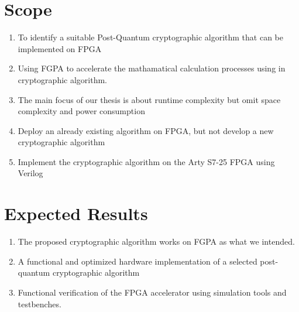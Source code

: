 \section{Scope}
\begin{enumerate}
	\item To identify a suitable Post-Quantum cryptographic algorithm that can be implemented on FPGA 
	\item Using FGPA to accelerate the mathamatical calculation processes using in cryptographic algorithm.
    \item The main focus of our thesis is about runtime complexity but omit space complexity and power consumption  
    \item Deploy an already existing algorithm on FPGA, but not develop a new cryptographic algorithm
    \item Implement the cryptographic algorithm on the Arty S7-25 FPGA using Verilog
\end{enumerate}

\section{Expected Results}
\begin{enumerate}
	\item The proposed cryptographic algorithm works on FGPA as what we intended.
	\item A functional and optimized hardware implementation of a selected post-quantum cryptographic algorithm
	\item Functional verification of the FPGA accelerator using simulation tools and testbenches.
\end{enumerate}

\newpage
